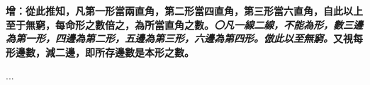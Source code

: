 \documentclass[12pt,b5paper,landscape]{article}
\newcommand{\ccom}[1]{{\footnotesize \emph{〇#1}}}
\newcommand{\cthm}[1]{{
\vspace{8pt}

\bfseries #1}}
\begin{document}
\begin{multicols}{2}
\cthm{增：從此推知，凡第一形當兩直角，第二形當四直角，第三形當六直角，自此以上至于無窮，每命形之數倍之，為所當直角之數。\ccom{凡一線二線，不能為形，數三邊為第一形，四邊為第二形，五邊為第三形，六邊為第四形。倣此以至無窮。}又視每形邊數，減二邊，即所存邊數是本形之數。}
\begin{center}
  ...
\end{center}

\end{multicols}
\end{document}
